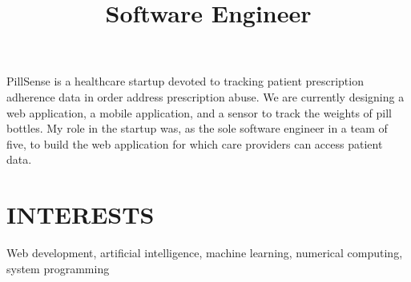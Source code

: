 \documentclass[margin]{res}
\begin{document}
\begin{resume}
\title{\textbf{Software Engineer}}
\begin{position}
PillSense is a healthcare startup devoted to tracking patient prescription adherence
data in order address prescription abuse. We are currently designing a web application,
a mobile application, and a sensor to track the weights of pill bottles. My role in the
startup was, as the sole software engineer in a team of five, to build the web application
for which care providers can access patient data.

\end{position}
\section{INTERESTS}
Web development, artificial intelligence, machine learning, numerical computing,
system programming
\end{resume}
\end{document}
